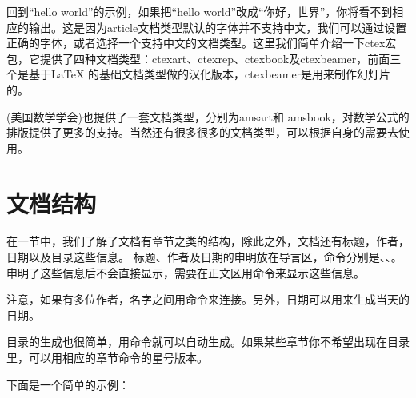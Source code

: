 回到``hello world''的示例，如果把“hello
world”改成“你好，世界”，你将看不到相应的输出。这是因为article文档类型默认的字体并不支持中文，我们可以通过设置正确的字体，或者选择一个支持中文的文档类型。这里我们简单介绍一下ctex宏包，它提供了四种文档类型：ctexart、ctexrep、ctexbook及ctexbeamer，前面三个是基于\LaTeX
的基础文档类型做的汉化版本，ctexbeamer是用来制作幻灯片的。

\AmS (美国数学学会)也提供了一套文档类型，分别为amsart和 amsbook，对数学公式的排版提供了更多的支持。当然还有很多很多的文档类型，可以根据自身的需要去使用。

\section{文档结构}
在一节中，我们了解了文档有章节之类的结构，除此之外，文档还有标题，作者，日期以及目录这些信息。
标题、作者及日期的申明放在导言区，命令分别是\texinline{\title}、\texinline{\author}、\texinline{\date}。申明了这些信息后不会直接显示，需要在正文区用\texinline{\maketitle}命令来显示这些信息。

注意，如果有多位作者，名字之间用\texinline{\and}命令来连接。另外，日期可以用\texinline{\today}来生成当天的日期。

目录的生成也很简单，用\texinline{\tableofcontents}命令就可以自动生成。如果某些章节你不希望出现在目录里，可以用相应的章节命令的星号版本。

下面是一个简单的示例：

